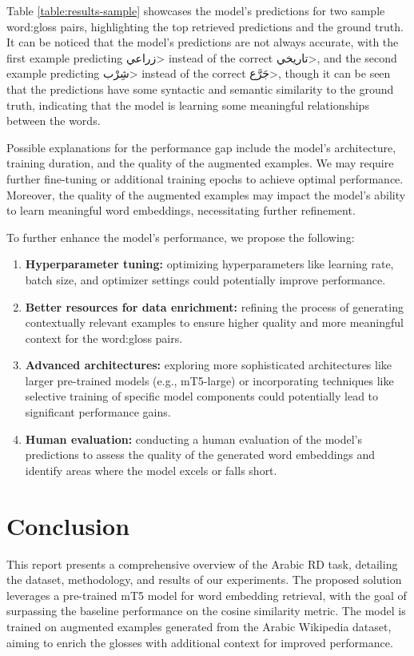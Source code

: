 \documentclass[12pt]{article}
\begin{document}
Table \ref{table:results-sample} showcases the model's predictions for two sample word:gloss pairs, highlighting the top retrieved predictions and the ground truth. It can be noticed that the model's predictions are not always accurate, with the first example predicting \<زراعي> instead of the correct \<تاريخي>, and the second example predicting \<شِرْب> instead of the correct \<جَرَّع>, though it can be seen that the predictions have some syntactic and semantic similarity to the ground truth, indicating that the model is learning some meaningful relationships between the words.

Possible explanations for the performance gap include the model's architecture, training duration, and the quality of the augmented examples. We may require further fine-tuning or additional training epochs to achieve optimal performance. Moreover, the quality of the augmented examples may impact the model's ability to learn meaningful word embeddings, necessitating further refinement.

To further enhance the model's performance, we propose the following:
\begin{enumerate}
    \item \textbf{Hyperparameter tuning:} optimizing hyperparameters like learning rate, batch size, and optimizer settings could potentially improve performance.
    \item \textbf{Better resources for data enrichment:} refining the process of generating contextually relevant examples to ensure higher quality and more meaningful context for the word:gloss pairs.
    \item \textbf{Advanced architectures:} exploring more sophisticated architectures like larger pre-trained models (e.g., mT5-large) or incorporating techniques like selective training of specific model components could potentially lead to significant performance gains.
    \item \textbf{Human evaluation:} conducting a human evaluation of the model's predictions to assess the quality of the generated word embeddings and identify areas where the model excels or falls short.
\end{enumerate} 

\newpage

\section{Conclusion}

This report presents a comprehensive overview of the Arabic RD task, detailing the dataset, methodology, and results of our experiments. The proposed solution leverages a pre-trained mT5 model for word embedding retrieval, with the goal of surpassing the baseline performance on the cosine similarity metric. The model is trained on augmented examples generated from the Arabic Wikipedia dataset, aiming to enrich the glosses with additional context for improved performance.
\end{document}

